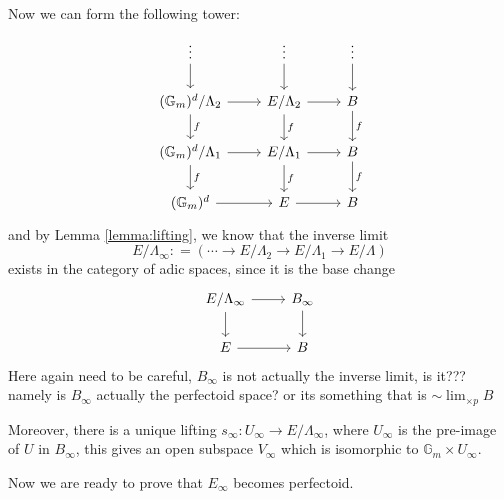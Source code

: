 \documentclass[11pt,oneside]{amsart}
\theoremstyle{theorem}
\theoremstyle{definition}
\theoremstyle{remark}
\begin{document}
Now we can form the following tower: 
\[
\begin{tikzcd}
\vdots  \arrow{d} & \vdots \arrow{d} & \vdots \arrow{d} \\
(\mathbb G_m)^d/\Lambda_2 \arrow{r}{} \arrow{d}{f} & E/\Lambda_2 \arrow{r}{}  \arrow{d}{f } & B  \arrow{d}{f} \\ 
(\mathbb G_m)^d/\Lambda_1 \arrow{r}{} \arrow{d}{f} & E/\Lambda_1 \arrow{r}{}  \arrow{d}{f } & B  \arrow{d}{f} \\ 
(\mathbb G_m)^d  \arrow{r}{} & E \arrow{r}{} & B 
\end{tikzcd}
\]
and by Lemma \ref{lemma:lifting}, we know that the inverse limit 
$$ E/\Lambda_{\infty} : = ( \cdots \rightarrow E/\Lambda_2 \rightarrow  E/\Lambda_1 \rightarrow E/\Lambda) $$ exists in the category of adic spaces, since it is the base change 
\[
\begin{tikzcd}
E/\Lambda_\infty  \arrow{r}{} \arrow{d}{} & B_\infty \arrow{d}{} \\
E \arrow{r}{} & B
\end{tikzcd}
\]
{\color{red} Here again need to be careful, $B_\infty$ is not actually the inverse limit, is it??? namely is $B_\infty$ actually the perfectoid space? or its something that is $\sim \lim_{\times p} B$ }

Moreover, there is a unique lifting $s_\infty: U_\infty \rightarrow E/\Lambda_{\infty}$, where $U_\infty$ is the pre-image of $U$ in $B_\infty$, this gives an open subspace $V_\infty$ which is isomorphic to $\mathbb G_m \times U_\infty$. 

Now we are ready to prove that $E_\infty$ becomes perfectoid. 
\end{document}
